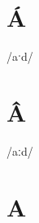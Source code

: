 \documentclass[10pt,a4paper,twoside]{book}
\begin{document}
\section*{Á}

\begin{multicols}{3}
 {/aˑd/} {}
\end{multicols}

\section*{Â}

\begin{multicols}{3}
 {/aːd/} {}
\end{multicols}

\section*{A}
\end{document}
